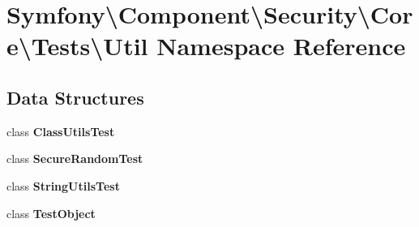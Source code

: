 \section{Symfony\textbackslash{}Component\textbackslash{}Security\textbackslash{}Core\textbackslash{}Tests\textbackslash{}Util Namespace Reference}
\label{namespace_symfony_1_1_component_1_1_security_1_1_core_1_1_tests_1_1_util}
\subsection*{Data Structures}
\begin{DoxyCompactItemize}
\item 
class {\bf Class\+Utils\+Test}
\item 
class {\bf Secure\+Random\+Test}
\item 
class {\bf String\+Utils\+Test}
\item 
class {\bf Test\+Object}
\end{DoxyCompactItemize}
